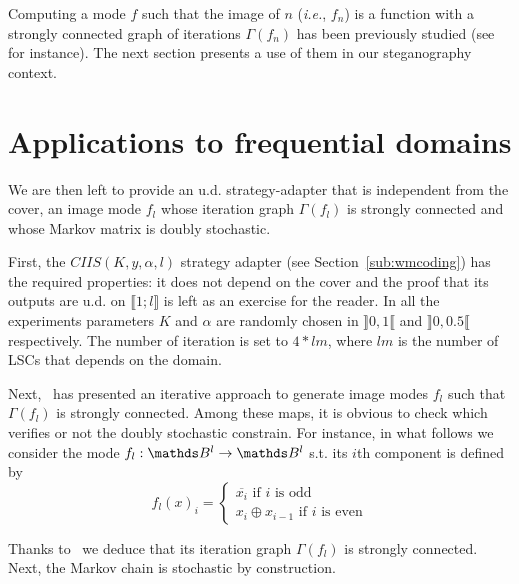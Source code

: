 \documentclass{comjnl}
\begin{document}
Computing a mode $f$ such that the image of $n$ (\textit{i.e.}, $f_n$) 
is a function with a strongly connected graph of iterations $\Gamma(f_n)$
has been previously studied (see~\cite{bcgr11:ip} for instance). 
The next section presents a use of them in our steganography context. 

















\section{Applications to frequential domains}
\label{sec:applications}
We are then left to provide an u.d. strategy-adapter that is independent
from the cover, an image mode $f_l$ whose iteration
graph $\Gamma(f_l)$ is strongly connected and whose Markov
matrix is doubly stochastic.

First, the $\textit{CIIS}(K,y,\alpha,l)$ strategy adapter (see Section~\ref{sub:wmcoding})
has the required properties:
it does not depend on the cover and the proof that its outputs
are u.d. on $\llbracket 1; l \rrbracket$ 
is left as an exercise for the reader.
In all the experiments parameters $K$ and $\alpha$ are randomly 
chosen in $\rrbracket 0, 1\llbracket$ and $\rrbracket 0, 0.5\llbracket$
respectively.
The number of iteration is set to $4*lm$, where $lm$ is the number of LSCs 
that depends on the domain.  
 
Next,~\cite{bcgr11:ip} has presented an iterative approach to generate image
modes $f_l$ such that $\Gamma(f_l)$ is strongly connected. Among these
maps, it is obvious to check which verifies or not the doubly
stochastic constrain.
For instance, in what follows we consider the mode
$f_l: \Bool^l \rightarrow \Bool^l$ s.t. its $i$th component is
defined by
\begin{equation}
\label{eq:fqq}
{f_l}(x)_i =
\left\{
\begin{array}{l}
\overline{x_i} \textrm{ if $i$ is odd} \\
x_i \oplus x_{i-1} \textrm{ if $i$ is even}
\end{array}
\right.
\end{equation}

Thanks to~\cite[Theorem 2]{bcgr11:ip} we deduce that its iteration graph 
$\Gamma(f_l)$ is strongly connected. 
Next, the Markov chain is stochastic by construction. 
\end{document}
